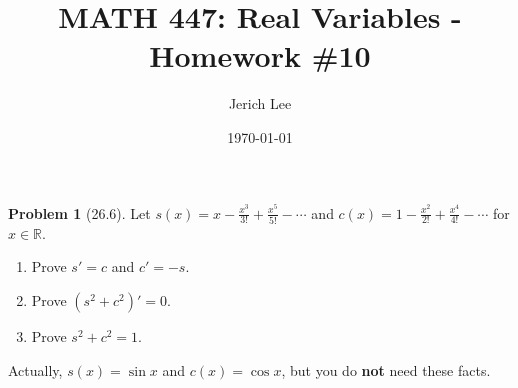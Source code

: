 \documentclass[12pt]{article}
\title{MATH 447: Real Variables - Homework \#10}
\author{Jerich Lee}
\date{\today}
\theoremstyle{definition} %
\newtheorem{problem}{Problem}
\theoremstyle{plain} %
\begin{document}
\maketitle
\begin{problem}[26.6]
    \noindent 
    Let $ s(x) = x - \frac{x^3}{3!} + \frac{x^5}{5!} - \cdots $ and $ c(x) = 1 - \frac{x^2}{2!} + \frac{x^4}{4!} - \cdots $ for $ x \in \mathbb{R} $.
    \begin{enumerate}
        \item Prove $ s' = c $ and $ c' = -s $.
        \item Prove $ (s^2 + c^2)' = 0 $.
        \item Prove $ s^2 + c^2 = 1 $.
    \end{enumerate}
    
    Actually, $ s(x) = \sin x $ and $ c(x) = \cos x $, but you do \textbf{not} need these facts.
\end{problem}
\end{document}
